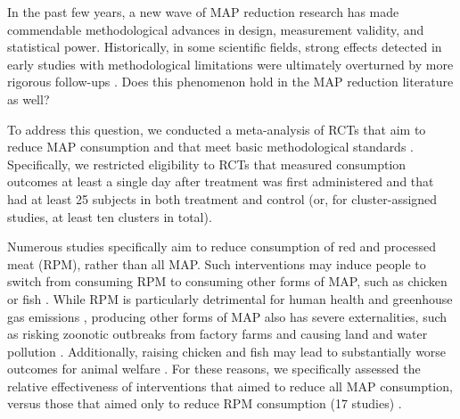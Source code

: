 \documentclass[sn-nature,referee,pdflatex]{sn-jnl}
\begin{document}
In the past few years, a new wave of MAP reduction research has made
commendable methodological advances in design, measurement validity, and
statistical power. Historically, in some scientific fields, strong
effects detected in early studies with methodological limitations were
ultimately overturned by more rigorous follow-ups
\citep{wykes2008, paluck2019, scheel2021}. Does this phenomenon hold in
the MAP reduction literature as well?

To address this question, we conducted a meta-analysis of RCTs that aim
to reduce MAP consumption and that meet basic methodological standards
\citep{andersson2021, kanchanachitra2020, abrahamse2007, acharya2004, banerjee2019, bianchi2022, bochmann2017, bschaden2020, carfora2023, cooney2014, cooney2016, feltz2022, haile2021, hatami2018, hennessy2016, jalil2023, mathur2021effectiveness, merrill2009, norris2014, peacock2017, polanco2022, sparkman2021, weingarten2022, piester2020, aberman2018, aldoh2023, allen2002, camp2019, coker2022, sparkman2020, berndsen2005, bertolaso2015, fehrenbach2015, mattson2020, shreedhar2021}.
Specifically, we restricted eligibility to RCTs that measured
consumption outcomes at least a single day after treatment was first
administered and that had at least 25 subjects in both treatment and
control (or, for cluster-assigned studies, at least ten clusters in
total).

Numerous studies specifically aim to reduce consumption of red and
processed meat (RPM), rather than all MAP. Such interventions may induce
people to switch from consuming RPM to consuming other forms of MAP,
such as chicken or fish \citep{grummon2023}. While RPM is particularly
detrimental for human health and greenhouse gas emissions
\citep{abete2014, lescinsky2022}, producing other forms of MAP also has
severe externalities, such as risking zoonotic outbreaks from factory
farms \citep{hafez2020} and causing land and water pollution
\citep{grvzinic2023}. Additionally, raising chicken and fish may lead to
substantially worse outcomes for animal welfare
\citep{mathur2022ethical}. For these reasons, we specifically assessed
the relative effectiveness of interventions that aimed to reduce all MAP
consumption, versus those that aimed only to reduce RPM consumption (17
studies)
\citep{anderson2017, carfora2017correlational, carfora2017randomised, carfora2019, carfora2019informational, delichatsios2001talking, dijkstra2022, emmons2005cancer, emmons2005project, jaacks2014, james2015, lee2018, lindstrom2015, perino2022, schatzkin2000, sorensen2005, wolstenholme2020}.
\end{document}
